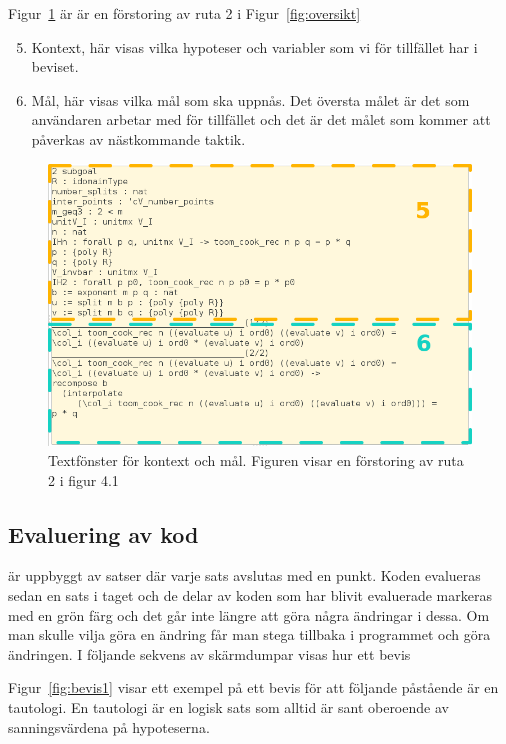 Figur~\ref{fig:kontext} är är en förstoring av ruta 2 i Figur~\ref{fig:oversikt}
\begin{enumerate}
  \setcounter{enumi}{4}
\item Kontext, här visas vilka hypoteser och variabler som vi för tillfället
  har i beviset.
\item Mål, här visas vilka mål som ska uppnås. Det översta målet är det som
  användaren arbetar med för tillfället och det är det målet som kommer att
  påverkas av nästkommande taktik.
\end{enumerate}

\begin{figure}[H]
  \centering
  \includegraphics[width=150mm]{images/Kontext}
  \caption[Fönster för kontext och mål]
   {Textfönster för kontext och mål. Figuren visar en förstoring av ruta 2 i
    figur 4.1}
  \label{fig:kontext}
\end{figure}




\subsection{Evaluering av kod}
\coq{} är uppbyggt av satser där varje sats avslutas med en punkt. Koden
evalueras sedan en sats i taget och de delar av koden som har blivit evaluerade
markeras med en grön färg och det går inte längre att göra några ändringar i
dessa. Om man skulle vilja göra en ändring får man stega tillbaka
i programmet och göra ändringen. I följande sekvens av skärmdumpar visas
hur ett bevis

Figur~\ref{fig:bevis1} visar ett exempel på ett bevis för att följande påstående
är en tautologi. En tautologi är en logisk sats som alltid är sant oberoende av
sanningsvärdena på hypoteserna.



